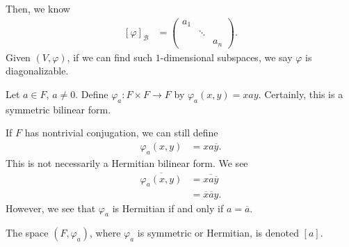 \documentclass[10pt]{mypackage}
\begin{document}
  Then, we know
  \begin{align*}
    \left[\varphi\right]_{\mathcal{B}} &= \begin{pmatrix}a_1 & & \\ & \ddots & \\ & & a_n\end{pmatrix}.
  \end{align*}
  Given $\left(V,\varphi\right)$, if we can find such $1$-dimensional subspaces, we say $\varphi$ is diagonalizable.\newline

  Let $a\in F$, $a\neq 0$. Define $\varphi_{a}\colon F\times F \rightarrow F$ by $\varphi_a\left(x,y\right) = xay$. Certainly, this is a symmetric bilinear form.\newline

  If $F$ has nontrivial conjugation, we can still define
  \begin{align*}
    \varphi_a\left(x,y\right) &= xa\overline{y}.
  \end{align*}
  This is not necessarily a Hermitian bilinear form. We see
  \begin{align*}
    \overline{\varphi_a\left(x,y\right)} &= \overline{xa\overline{y}}\\
                                         &= \overline{x}\overline{a} y.
  \end{align*}
  However, we see that $\varphi_a$ is Hermitian if and only if $a = \overline{a}$.\newline

  The space $\left(F,\varphi_a\right)$, where $\varphi_a$ is symmetric or Hermitian, is denoted $\left[a\right]$.\newline
\end{document}
